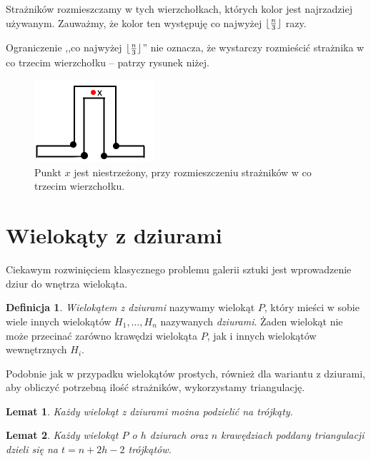 \documentclass[brudnopis]{xmgr}
\DeclarePairedDelimiter\floor{\lfloor}{\rfloor}
\newtheorem{Lemat}{Lemat}
\theoremstyle{definition}
\newtheorem{Definicja}{Definicja}
\begin{document}
	Strażników rozmieszczamy w tych wierzchołkach, których kolor jest najrzadziej używanym. Zauważmy, że kolor ten występuję co najwyżej $\floor{\frac{n}{3}}$ razy. 

\indent Ograniczenie ,,co najwyżej $\floor{\frac{n}{3}}$'' nie oznacza, że wystarczy rozmieścić strażnika w co trzecim wierzchołku -- patrzy rysunek niżej.
\begin{figure}[ht!]
  \centering
  \includegraphics{rysunki/co_trzeci.png}
  \caption{Punkt $x$ jest niestrzeżony, przy rozmieszczeniu strażników w co trzecim wierzchołku.}
\end{figure} 

\section{Wielokąty z dziurami}
Ciekawym rozwinięciem klasycznego problemu galerii sztuki jest wprowadzenie dziur do wnętrza wielokąta.

\begin{Definicja} \label{def wielokat z dziurami}
  \emph{Wielokątem z dziurami} nazywamy wielokąt $P$, który mieści w sobie wiele innych wielokątów $H_1, \ldots, H_n$ nazywanych \emph{dziurami}. Żaden wielokąt nie może przecinać zarówno krawędzi wielokąta $P$, jak i innych wielokątów wewnętrznych $H_i$.
\end{Definicja}

\indent Podobnie jak w przypadku wielokątów prostych, również dla wariantu z dziurami, aby obliczyć potrzebną ilość strażników, wykorzystamy triangulację.

\begin{Lemat} \cite{orourke}
  Każdy wielokąt z dziurami można podzielić na trójkąty.
\end{Lemat}

\begin{Lemat}\label{t trójkątów triangulacja} \cite{orourke}
  Każdy wielokąt $P$ o $h$ dziurach oraz $n$ krawędziach poddany triangulacji dzieli się na $t = n + 2h - 2$ trójkątów.
\end{Lemat}
\end{document}
